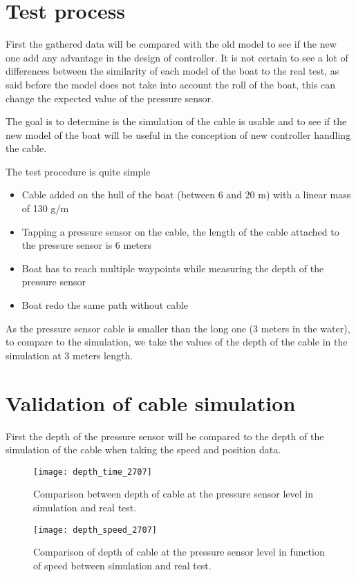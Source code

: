 \section{Test process}

First the gathered data will be compared with the old model to see if the new one add any advantage in the design of controller. It is not certain to see a lot of differences between the similarity of each model of the boat to the real test, as said before the model does not take into account the roll of the boat, this can change the expected value of the pressure sensor.

 The goal is to determine is the simulation of the cable is usable and to see if the new model of the boat will be useful in the conception of new controller handling the cable. 
 
 The test procedure is quite simple
 
\begin{itemize}[label=$-$,itemsep=0cm,topsep=0cm]
\item Cable added on the hull of the boat (between 6 and 20 m) with a linear mass of 130 g/m
\item Tapping a pressure sensor on the cable, the length of the cable attached to the pressure sensor is 6 meters
\item Boat has to reach multiple waypoints while measuring the depth of the pressure sensor
\item Boat redo the same path without cable
\end{itemize}

As the pressure sensor cable is smaller than the long one (3 meters in the water), to compare to the simulation, we take the values of the depth of the cable in the simulation at 3 meters length.


\section{Validation of cable simulation}

First the depth of the pressure sensor will be compared to the depth of the simulation of the cable when taking the speed and position data.

\begin{figure}[H]
\centering
    \begin{minipage}[b]{0.4\textwidth}
    \centering
    \texttt{[image: depth\_time\_2707]}
    \caption{Comparison between depth of cable at the pressure sensor level in simulation and real test.}
    \label{fig:comp_depth_time_2007}
    \end{minipage}
    \hfill
    \begin{minipage}[b]{0.45\textwidth}
    \centering
    \texttt{[image: depth\_speed\_2707]}
    \caption{Comparison of depth of cable at the pressure sensor level in function of speed between simulation and real test.}
    \label{fig:comp_depth_speed_2007}
    \end{minipage}
\end{figure}

